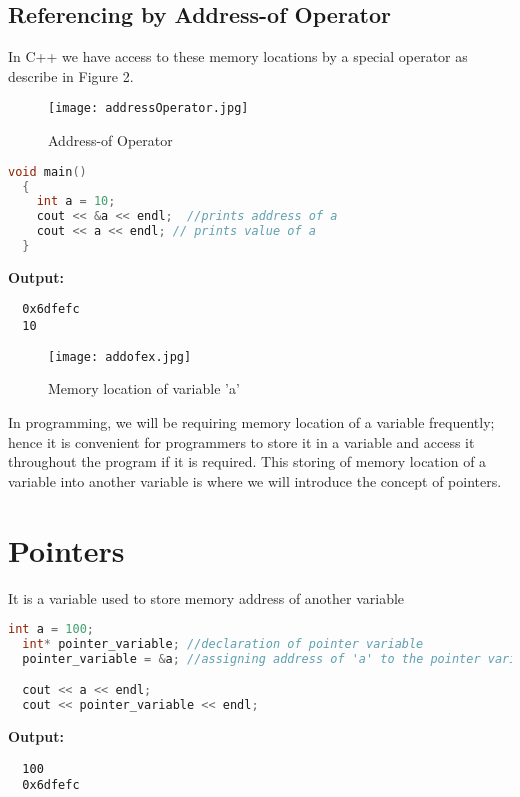 \documentclass[11pt,fleqn]{book} %
\begin{document}

\subsection{Referencing by Address-of Operator}
In C++ we have access to these memory locations by a special operator as describe in Figure 2.

\begin{figure}[h]
  \centering\texttt{[image: addressOperator.jpg]}
  \caption{Address-of Operator}
\end{figure}

\begin{lstlisting}[language=C++, caption = Address of a variable]
  void main()
  {
    int a = 10;
    cout << &a << endl;  //prints address of a
    cout << a << endl; // prints value of a 
  }
\end{lstlisting}
\textbf{Output:}
\begin{lstlisting}
  0x6dfefc 
  10
\end{lstlisting}

\begin{figure}[h]
  \centering\texttt{[image: addofex.jpg]}
  \caption{Memory location of variable 'a'}
\end{figure} 
In programming, we will be requiring memory location of a variable frequently; hence it is convenient for programmers to store it in a variable and access it throughout the program if it is required. This storing of memory location of a variable into another variable is where we will introduce the concept of pointers. 
\section{Pointers}
\begin{definition}[Pointer] It is a variable used to store memory address of another variable
\end{definition}
\begin{lstlisting}[language=C++, caption = Pointer variable]
  int a = 100;
  int* pointer_variable; //declaration of pointer variable
  pointer_variable = &a; //assigning address of 'a' to the pointer variable

  cout << a << endl;
  cout << pointer_variable << endl;

\end{lstlisting}
\textbf{Output:} 
\begin{lstlisting}
  100
  0x6dfefc
\end{lstlisting}
\end{document}
